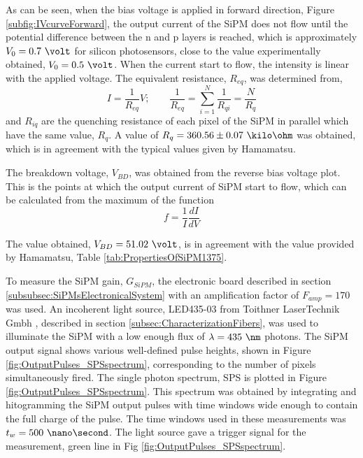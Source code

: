 As can be seen, when the bias voltage is applied in forward direction, Figure \ref{subfig:IVcurveForward}, the output current of the SiPM does not flow until the potential difference between the n and p layers is reached, which is approximately $V_0=0.7~\volt$ for silicon photosensors, close to the value experimentally obtained, $V_0= 0.5~\volt$. When the current start to flow, the intensity is linear with the applied voltage. The equivalent resistance, $R_{eq}$, was determined from, 
\begin{equation}
I=\frac{1}{R_{eq}}V;  \qquad \frac{1}{R_{eq}} = \sum_{i=1}^{N}\frac{1}{R_{qi}}= \frac{N}{R_{q}}
\label{QuenchingResistance}
\end{equation}
and $R_{iq}$ are the quenching resistance of each pixel of the SiPM in parallel which have the same value, $R_{q}$. A value of $R_{q}= 360.56 \pm 0.07~\kilo\ohm$ was obtained, which is in agreement with the typical values given by Hamamatsu.

The breakdown voltage, $V_{BD}$, was obtained from the reverse bias voltage plot. This is the points at which the output current of SiPM start to flow, which can be calculated from the maximum of the function 
\begin{equation}
f=\frac{1}{I}\frac{dI}{dV}
\label{BreakDownVoltageFunction}
\end{equation}

The value obtained, $V_{BD}=51.02~\volt$, is in agreement with the value provided by Hamamatsu, Table \ref{tab:PropertiesOfSiPM1375}.

To measure the SiPM gain, $G_{SiPM}$, the electronic board described in section \ref{subsubsec:SiPMsElectronicalSystem} with an amplification factor of $F_{amp}=170$ was used. An incoherent light source, LED435-03 from Toithner LaserTechnik Gmbh \cite{LEDRLT}, described in section \ref{subsec:CharacterizationFibers}, was used to illuminate the SiPM with a low enough flux of $\lambda= 435~\nm$ photons. The SiPM output signal shows various well-defined pulse heights, shown in Figure \ref{fig:OutputPulses_SPSspectrum}, corresponding to the number of pixels simultaneously fired. The single photon spectrum, SPS is plotted in Figure \ref{fig:OutputPulses_SPSspectrum}. This spectrum was obtained by integrating and hitogramming the SiPM output pulses with time windows wide enough to contain the full charge of the pulse. The time windows used in these measurements was $t_w= 500~\nano\second$. The light source gave a trigger signal for the measurement, green line in Fig \ref{fig:OutputPulses_SPSspectrum}.

